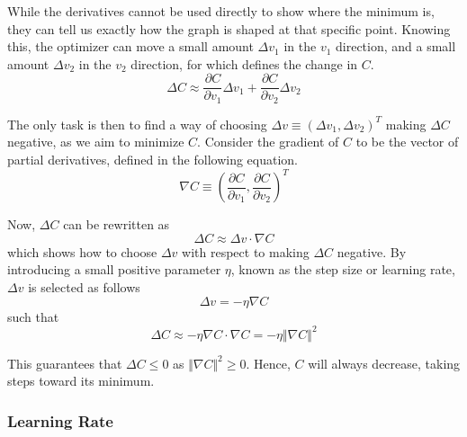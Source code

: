         While the derivatives cannot be used directly to show where the minimum is, they can tell us exactly how the graph is shaped at that specific point. 
        Knowing this, the optimizer can move a small amount $\Delta v_1$ in the $v_1$ direction, and a small amount $\Delta v_2$ in the $v_2$ direction, for which  defines the change in $C$.
        \begin{equation}\label{eq:mopt-DeltaC}
            \Delta C \approx \frac{\partial C}{\partial v_1}\Delta v_1 + \frac{\partial C}{\partial v_2} \Delta v_2
        \end{equation}
        
        The only task is then to find a way of choosing $\Delta v\equiv (\Delta v_1, \Delta v_2)^T$ making $\Delta C$ negative, as we aim to minimize $C$. Consider the gradient of $C$ to be the vector of partial derivatives, defined in the following equation.
        \begin{equation}\label{eq:mopt-gradient}
            \nabla C \equiv \left(\frac{\partial C}{\partial v_1}, \frac{\partial C}{\partial v_2}\right)^T
        \end{equation}
        
        Now, $\Delta C$ can be rewritten as
        \begin{equation}\label{eq:mopt-DeltaC-gradient}
            \Delta C \approx \Delta v \cdot \nabla C
        \end{equation}
        which shows how to choose $\Delta v$ with respect to making $\Delta C$ negative. By introducing a small positive parameter $\eta$, known as the step size or learning rate, $\Delta v$ is selected as follows
        \begin{equation}
            \Delta v = -\eta \nabla C
        \end{equation}
        such that 
        \begin{equation}
            \Delta C \approx -\eta \nabla C \cdot \nabla C = -\eta \Vert\nabla C\Vert^2
        \end{equation}
        
        This guarantees that $\Delta C \leq 0$ as $\Vert\nabla C\Vert^2 \geq 0$. Hence, $C$ will always decrease, taking steps toward its minimum. 
        
        \subsubsection{Learning Rate}
        
